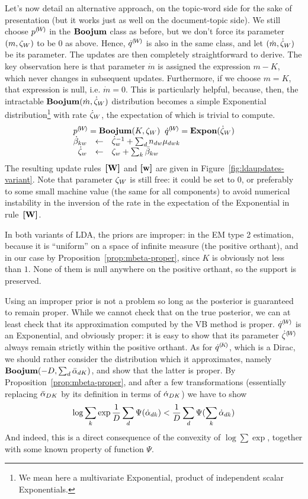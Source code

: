 Let's now detail an alternative approach, on the topic-word side for the sake of presentation (but it works just as well on the document-topic side). We still choose ${p}^{(\!{W}\!)}$ in the $\mathbf{Boojum}$ class as before, but we don't force its parameter $(m,\zeta_W)$ to be $0$ as above. Hence, ${\dot{q}}^{(\!{W}\!)}$ is also in the same class, and let $(\dot{m},\dot{\zeta}_W)$ be its parameter. The updates are then completely straightforward to derive. The key observation here is that parameter $\dot{m}$ is assigned the expression $m-K$, which never changes in subsequent updates. Furthermore, if we choose $m=K$, that expression is null, i.e. $\dot{m}=0$. This is particularly helpful, because, then, the intractable $\mathbf{Boojum}(\dot{m},\dot{\zeta}_W)$ distribution becomes a simple Exponential distribution\footnote{We mean here a multivariate Exponential, product of independent scalar Exponentials.} with rate $\dot{\zeta}_W$, the expectation of which is trivial to compute.
\[
\begin{array}{rcl}
\multicolumn{3}{c}{
\cpnt{p}{W} = \mbeta(K,\pmW_W)
\;\;
\cpnt{\dot{q}}{W} = \textbf{Expon}(\vvmW_W)
} \\
\vvmKW_{kw} & \assignn & \vvmW_w^{-1}+\sum_dn_{dw}\vvmDWK_{dwk} \\
\vvmW_w & \assignn & \pmW_w+\sum_k\vvmbKW_{kw}
\end{array}
\]
The resulting update rules~$\textbf{[W]}$ and  $\textbf{[w]}$ are given in Figure~\ref{fig:ldaupdates-variant}. Note that parameter $\zeta_W$ is still free: it could be set to $0$, or preferably to some small machine value (the same for all components) to avoid numerical instability in the inversion of the rate in the expectation of the Exponential in rule~$\textbf{[W]}$.

In both variants of LDA, the priors are improper: in the EM type 2 estimation, because it is ``uniform'' on a space of infinite measure (the positive orthant), and in our case by Proposition~\ref{prop:mbeta-proper}, since $K$ is obviously not less than $1$. None of them is null anywhere on the positive orthant, so the support is preserved.

Using an improper prior is not a problem so long as the posterior is guaranteed to remain proper. While we cannot check that on the true posterior, we can at least check that its approximation computed by the VB method is proper. ${\dot{q}}^{(\!{W}\!)}$ is an Exponential, and obviously proper: it is easy to show that its parameter ${\dot{\zeta}}^{(\!{W}\!)}$ always remain strictly within the positive orthant. As for ${\dot{q}}^{(\!{K}\!)}$, which is a Dirac, we should rather consider the distribution which it approximates, namely $\mathbf{Boojum}(-D,\sum_d\bar{\alpha}_{dK})$, and show that the latter is proper. By Proposition~\ref{prop:mbeta-proper}, and after a few transformations (essentially replacing $\bar{\alpha}_{DK}$ by its definition in terms of $\dot{\alpha}_{DK}$) we have to show
\[
\log\sum_k\exp\frac{1}{D}\sum_d\Psi(\dot{\alpha}_{dk})<\frac{1}{D}\sum_{d}\Psi(\sum_k\dot{\alpha}_{dk})
\]
And indeed, this is a direct consequence of the convexity of $\log\sum\exp$, together with some known property of function $\Psi$.

